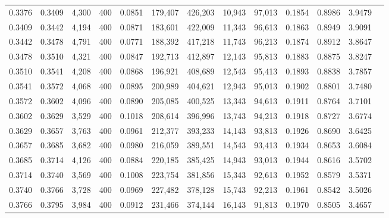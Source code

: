\begin{tabular}{rrrrrrrrrrrrr}
0.3376 & 0.3409 &  4,300 & 400 &                                     0.0851 & 179,407 & 426,203 &  10,943 &  97,013 & 0.1854 & 0.8986 & 3.9479 \\
0.3409 & 0.3442 &  4,194 & 400 &                                     0.0871 & 183,601 & 422,009 &  11,343 &  96,613 & 0.1863 & 0.8949 & 3.9091 \\
0.3442 & 0.3478 &  4,791 & 400 &                                     0.0771 & 188,392 & 417,218 &  11,743 &  96,213 & 0.1874 & 0.8912 & 3.8647 \\
0.3478 & 0.3510 &  4,321 & 400 &                                     0.0847 & 192,713 & 412,897 &  12,143 &  95,813 & 0.1883 & 0.8875 & 3.8247 \\
0.3510 & 0.3541 &  4,208 & 400 &                                     0.0868 & 196,921 & 408,689 &  12,543 &  95,413 & 0.1893 & 0.8838 & 3.7857 \\
0.3541 & 0.3572 &  4,068 & 400 &                                     0.0895 & 200,989 & 404,621 &  12,943 &  95,013 & 0.1902 & 0.8801 & 3.7480 \\
0.3572 & 0.3602 &  4,096 & 400 &                                     0.0890 & 205,085 & 400,525 &  13,343 &  94,613 & 0.1911 & 0.8764 & 3.7101 \\
0.3602 & 0.3629 &  3,529 & 400 &                                     0.1018 & 208,614 & 396,996 &  13,743 &  94,213 & 0.1918 & 0.8727 & 3.6774 \\
0.3629 & 0.3657 &  3,763 & 400 &                                     0.0961 & 212,377 & 393,233 &  14,143 &  93,813 & 0.1926 & 0.8690 & 3.6425 \\
0.3657 & 0.3685 &  3,682 & 400 &                                     0.0980 & 216,059 & 389,551 &  14,543 &  93,413 & 0.1934 & 0.8653 & 3.6084 \\
0.3685 & 0.3714 &  4,126 & 400 &                                     0.0884 & 220,185 & 385,425 &  14,943 &  93,013 & 0.1944 & 0.8616 & 3.5702 \\
0.3714 & 0.3740 &  3,569 & 400 &                                     0.1008 & 223,754 & 381,856 &  15,343 &  92,613 & 0.1952 & 0.8579 & 3.5371 \\
0.3740 & 0.3766 &  3,728 & 400 &                                     0.0969 & 227,482 & 378,128 &  15,743 &  92,213 & 0.1961 & 0.8542 & 3.5026 \\
0.3766 & 0.3795 &  3,984 & 400 &                                     0.0912 & 231,466 & 374,144 &  16,143 &  91,813 & 0.1970 & 0.8505 & 3.4657 \\

\end{tabular}
